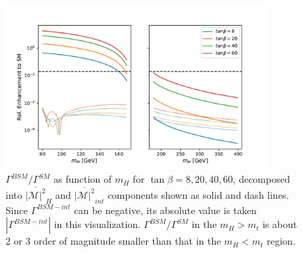 \begin{figure}[ht]
    \centering
    \includegraphics[width=0.89\textwidth]{chapters/RelatedWorks/sectionBSM/figures/RelEnhance2HDM_1d.pdf}
    \caption{ $\Gamma^{BSM}/\Gamma^{SM}$ as function of $m_H$ for $\tan\beta= 8,20,40,60$, decomposed into $\overline{ |\mathcal{M}|^2 } _{H}$ and $\overline{ |\mathcal{M}|^2 } _{int}$  components shown as solid and dash lines. Since $\Gamma^{BSM-int}$ can be negative, its absolute value is taken $|\Gamma^{BSM-int}|$ in this visualization. $\Gamma^{BSM}/\Gamma^{SM}$ in the $m_H>m_t$ is about 2 or 3 order of magnitude smaller than that in the  $m_H<m_t$ region. }
    \label{fig:relatedWorks:bsm:chargedHiggs:relEnhance1d}
\end{figure}







